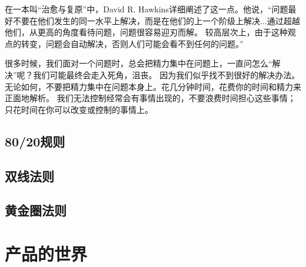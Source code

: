\documentclass[UTF8]{ctexart}
\begin{document}
在一本叫“治愈与复原”中，David R. Hawkins详细阐述了这一点。他说，“问题最好不要在他们发生的同一水平上解决，而是在他们的上一个阶级上解决...通过超越他们，从更高的角度看待问题，问题很容易迎刃而解。
较高层次上，由于这种观点的转变，问题会自动解决，否则人们可能会看不到任何的问题。”

很多时候，我们面对一个问题时，总会把精力集中在问题上，一直问怎么“解决”呢？我们可能最终会走入死角，沮丧。
因为我们似乎找不到很好的解决办法。无论如何，不要把精力集中在问题本身上。花几分钟时间，花费你的时间和精力来正面地解析。
我们无法控制经常会有事情出现的，不要浪费时间担心这些事情；只花时间在你可以改变或控制的事情上。

\subsection{80/20规则}
\subsection{双线法则}
\subsection{黄金圈法则}

\section{产品的世界}
\end{document}
